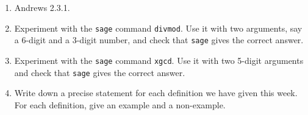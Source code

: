 \documentclass[11pt]{article}
\def\sage{{\tt sage} }
\begin{document}
\begin{enumerate}
\item Andrews 2.3.1.

\item Experiment with the \sage command {\tt divmod}.
Use it with two arguments, say a 6-digit and a 3-digit number, and check that \sage gives the correct answer.

\item Experiment with the \sage command {\tt xgcd}.
Use it with two 5-digit arguments and check that \sage gives the correct answer.

\item Write down a precise statement for each definition we have given this week.
For each definition, give an example and a non-example.

\end{enumerate}
\end{document}

